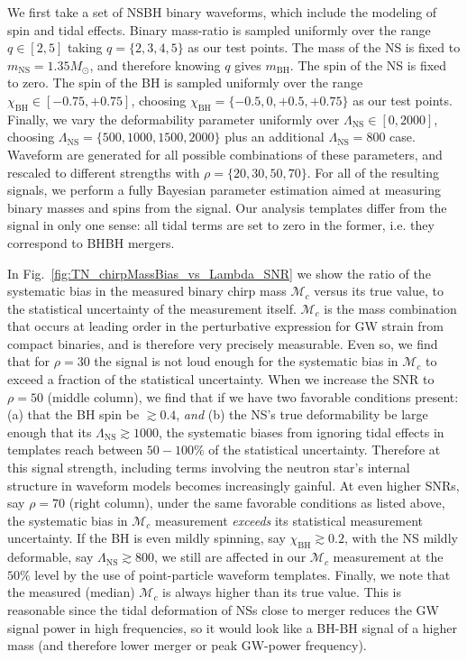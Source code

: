 \documentclass[aps,prd,amsmath,floats,floatfix, twocolumn,
superscriptaddress,nofootinbib,showpacs]{revtex4-1}
\newcommand{\lambdans}{\Lambda_\mathrm{NS}}
\newcommand{\chibh}{\chi_\mathrm{BH}}
\newcommand{\mbh}{m_\mathrm{BH}}
\newcommand{\mns}{m_\mathrm{NS}}
\newcommand{\mchirp}{\mathcal{M}_c}
\begin{document}
We first take a set of NSBH binary waveforms, which include the modeling of spin and
tidal effects. Binary mass-ratio is sampled
uniformly over the range $q\in[2,5]$ taking $q=\{2,3,4,5\}$ as our test points. The
mass of the NS is fixed to $\mns=1.35M_\odot$, and therefore knowing $q$ gives $\mbh$.
The spin of the NS is fixed to zero. The spin of the BH is sampled uniformly over the
range $\chibh\in[-0.75, +0.75]$, choosing $\chibh=\{-0.5, 0, +0.5, +0.75\}$ as our
test points. Finally, we vary the deformability parameter uniformly over 
$\lambdans\in[0,2000]$, choosing $\lambdans=\{500, 1000, 1500, 2000\}$ plus an additional
$\lambdans=800$ case. Waveform are generated for all possible combinations of these
parameters, and rescaled to different strengths with $\rho=\{20, 30, 50, 70\}$. For all
of the resulting signals, we perform a fully Bayesian parameter estimation aimed at
measuring binary masses and spins from the signal. Our analysis
templates differ from the signal in only one sense: all tidal terms are set to zero
in the former, i.e. they correspond to BHBH mergers.

In Fig.~\ref{fig:TN_chirpMassBias_vs_Lambda_SNR} we show the ratio of the systematic
bias in the measured binary chirp mass $\mchirp$ versus its true value, to the 
statistical uncertainty of the measurement itself. $\mchirp$ is the mass combination
that occurs at leading order in the perturbative expression for GW strain from 
compact binaries, and is therefore very precisely measurable. Even so, we find that
for $\rho=30$ the signal is not loud enough for the systematic bias in $\mchirp$
to exceed a fraction of the statistical uncertainty. When we increase the SNR to 
$\rho=50$ (middle column), we find that if we have two favorable conditions present:
(a) that the BH spin be $\gtrsim 0.4$, {\it and} (b) the NS's true deformability
be large enough that its $\lambdans \gtrsim 1000$, the systematic biases from
ignoring tidal effects in templates reach between $50-100\%$ of the statistical
uncertainty. Therefore at this signal strength, including terms involving the neutron
star's internal structure in waveform models becomes increasingly gainful. At 
even higher SNRs, say $\rho=70$ (right column), under the same favorable conditions
as listed above, the systematic bias in $\mchirp$ measurement {\it exceeds} its 
statistical measurement uncertainty. If the BH is even mildly spinning, say
$\chibh\gtrsim 0.2$, with the NS mildly deformable, say $\lambdans\gtrsim 800$, 
we still are affected in our $\mchirp$ measurement at the $50\%$ level by the 
use of point-particle waveform templates. Finally, we note that the measured (median)
$\mchirp$ is always higher than its true value. This is reasonable since the tidal 
deformation of NSs close to merger reduces the GW signal power in high frequencies, so
it would look like a BH-BH signal of a higher mass (and therefore lower merger or
peak GW-power frequency).
\end{document}
